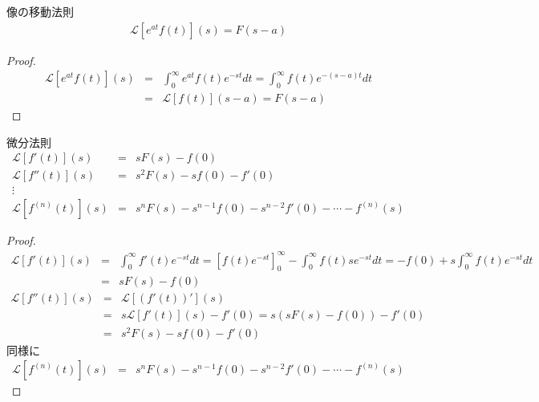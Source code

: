 \begin{exprbox}{像の移動法則}
    \begin{eqnarray}
        \mathcal{L}[e^{at}f(t)](s) = F(s - a)
    \end{eqnarray}
    \begin{proof}
        \begin{eqnarray*}
            \mathcal{L}[e^{at}f(t)](s) &=& \int_{0}^{\infty} e^{at} f(t) e^{-st} dt
            = \int_{0}^{\infty} f(t) e^{-(s - a)t} dt \\
            &=& \mathcal{L}[f(t)](s - a) = F(s - a)
        \end{eqnarray*}
    \end{proof}
\end{exprbox}

\begin{exprbox}{微分法則}
    \begin{eqnarray}
        \mathcal{L}[f'(t)](s) &=& sF(s) - f(0) \\
        \mathcal{L}[f''(t)](s) &=& s^2F(s) - sf(0) - f'(0) \\
        \vdots \\
        \mathcal{L}[f^{(n)}(t)](s) &=& s^nF(s) - s^{n - 1}f(0) - s^{n - 2}f'(0) - \cdots - f^{(n)}(s)
    \end{eqnarray}
    \begin{proof}
        \begin{eqnarray*}
            \mathcal{L}[f'(t)](s) &=& \int_{0}^{\infty} f'(t) e^{-st} dt
            = \left[f(t) e^{-st}\right]_0^\infty - \int_{0}^{\infty} f(t) se^{-st} dt
            = -f(0) + s \int_{0}^{\infty} f(t) e^{-st} dt\\
            &=& sF(s) - f(0)
        \end{eqnarray*}
        \begin{eqnarray*}
            \mathcal{L}[f''(t)](s) &=& \mathcal{L}[\left(f'(t)\right)'](s) \\
            &=& s \mathcal{L}[f'(t)](s) - f'(0) = s\left(sF(s) - f(0)\right) - f'(0) \\
            &=& s^2 F(s) - s f(0) - f'(0)
        \end{eqnarray*}
        同様に
        \begin{eqnarray*}
            \mathcal{L}[f^{(n)}(t)](s) &=& s^nF(s) - s^{n - 1}f(0) - s^{n - 2}f'(0) - \cdots - f^{(n)}(s)
        \end{eqnarray*}
    \end{proof}
\end{exprbox}

